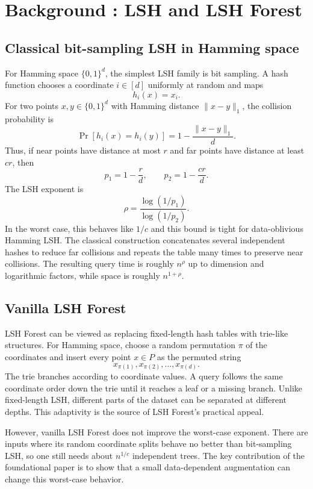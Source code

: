 \documentclass[11pt]{article}
\begin{document}
\section{Background : LSH and LSH Forest}

\subsection{Classical bit-sampling LSH in Hamming space}

For Hamming space $\{0,1\}^d$, the simplest LSH family is bit sampling. A hash function chooses a coordinate $i \in [d]$ uniformly at random and maps
\[
    h_i(x) = x_i.
\]
For two points $x,y \in \{0,1\}^d$ with Hamming distance $\|x-y\|_1$, the collision probability is
\[
    \Pr[h_i(x)=h_i(y)] = 1 - \frac{\|x-y\|_1}{d}.
\]
Thus, if near points have distance at most $r$ and far points have distance at least $cr$, then
\[
    p_1 = 1 - \frac{r}{d}, \qquad p_2 = 1 - \frac{cr}{d}.
\]
The LSH exponent is
\[
    \rho = \frac{\log(1/p_1)}{\log(1/p_2)}.
\]
In the worst case, this behaves like $1/c$ and this bound is tight for data-oblivious Hamming LSH. The classical construction concatenates several independent hashes to reduce far collisions and repeats the table many times to preserve near collisions. The resulting query time is roughly $n^\rho$ up to dimension and logarithmic factors, while space is roughly $n^{1+\rho}$.

\subsection{Vanilla LSH Forest}

LSH Forest can be viewed as replacing fixed-length hash tables with trie-like structures. For Hamming space, choose a random permutation $\pi$ of the coordinates and insert every point $x \in P$ as the permuted string
\[
    x_{\pi(1)}, x_{\pi(2)}, \ldots, x_{\pi(d)}.
\]
The trie branches according to coordinate values. A query follows the same coordinate order down the trie until it reaches a leaf or a missing branch. Unlike fixed-length LSH, different parts of the dataset can be separated at different depths. This adaptivity is the source of LSH Forest's practical appeal.

However, vanilla LSH Forest does not improve the worst-case exponent. There are inputs where its random coordinate splits behave no better than bit-sampling LSH, so one still needs about $n^{1/c}$ independent trees. The key contribution of the foundational paper is to show that a small data-dependent augmentation can change this worst-case behavior.
\end{document}
